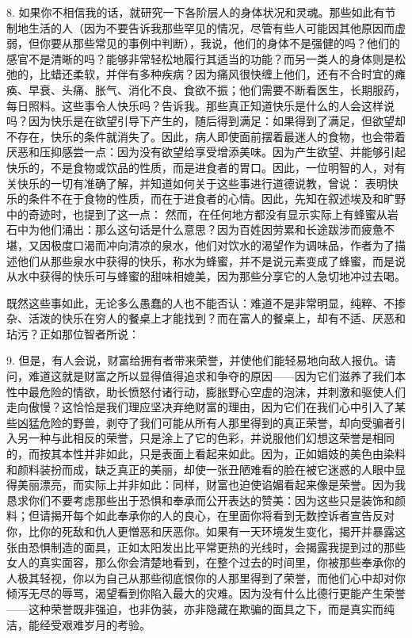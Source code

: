 8. 如果你不相信我的话，就研究一下各阶层人的身体状况和灵魂。那些如此有节制地生活的人（因为不要告诉我那些罕见的情况，尽管有些人可能因其他原因而虚弱，但你要从那些常见的事例中判断），我说，他们的身体不是强健的吗？他们的感官不是清晰的吗？能够非常轻松地履行其适当的功能？而另一类人的身体则是松弛的，比蜡还柔软，并伴有多种疾病？因为痛风很快缠上他们，还有不合时宜的瘫痪、早衰、头痛、胀气、消化不良、食欲不振；他们需要不断看医生，长期服药，每日照料。这些事令人快乐吗？告诉我。那些真正知道快乐是什么的人会这样说吗？因为快乐是在欲望引导下产生的，随后得到满足：如果得到了满足，但欲望却不存在，快乐的条件就消失了。因此，病人即使面前摆着最迷人的食物，也会带着厌恶和压抑感尝一点：因为没有欲望给享受增添美味。因为产生欲望、并能够引起快乐的，不是食物或饮品的性质，而是进食者的胃口。因此，一位明智的人，对有关快乐的一切有准确了解，并知道如何关于这些事进行道德说教，曾说： 表明快乐的条件不在于食物的性质，而在于进食者的心情。因此，先知在叙述埃及和旷野中的奇迹时，也提到了这一点： 然而，在任何地方都没有显示实际上有蜂蜜从岩石中为他们涌出：那么这句话是什么意思？因为百姓因劳累和长途跋涉而疲惫不堪，又因极度口渴而冲向清凉的泉水，他们对饮水的渴望作为调味品，作者为了描述他们从那些泉水中获得的快乐，称水为蜂蜜，并不是说元素变成了蜂蜜，而是说从水中获得的快乐可与蜂蜜的甜味相媲美，因为那些分享它的人急切地冲过去喝。\par

既然这些事如此，无论多么愚蠢的人也不能否认：难道不是非常明显，纯粹、不掺杂、活泼的快乐在穷人的餐桌上才能找到？而在富人的餐桌上，却有不适、厌恶和玷污？正如那位智者所说：\par

9. 但是，有人会说，财富给拥有者带来荣誉，并使他们能轻易地向敌人报仇。请问，难道这就是财富之所以显得值得追求和争夺的原因——因为它们滋养了我们本性中最危险的情欲，助长愤怒付诸行动，膨胀野心空虚的泡沫，并刺激和驱使人们走向傲慢？这恰恰是我们理应坚决弃绝财富的理由，因为它们在我们心中引入了某些凶猛危险的野兽，剥夺了我们可能从所有人那里得到的真正荣誉，却向受骗者引入另一种与此相反的荣誉，只是涂上了它的色彩，并说服他们幻想这荣誉是相同的，而按其本性并非如此，只是表面上看起来如此。因为，正如娼妓的美色由染料和颜料装扮而成，缺乏真正的美丽，却使一张丑陋难看的脸在被它迷惑的人眼中显得美丽漂亮，而实际上并非如此：同样，财富也迫使谄媚看起来像是荣誉。因为我恳求你们不要考虑那些出于恐惧和奉承而公开表达的赞美：因为这些只是装饰和颜料；但请揭开每个如此奉承你的人的良心，在里面你将看到无数控诉者宣告反对你，比你的死敌和仇人更憎恶和厌恶你。如果有一天环境发生变化，揭开并暴露这张由恐惧制造的面具，正如太阳发出比平常更热的光线时，会揭露我提到过的那些女人的真实面容，那么你会清楚地看到，在整个过去的时间里，你被那些奉承你的人极其轻视，你以为自己从那些彻底恨你的人那里得到了荣誉，而他们心中却对你倾泻无尽的辱骂，渴望看到你陷入最大的灾难。因为没有什么比德行更能产生荣誉——这种荣誉既非强迫，也非伪装，亦非隐藏在欺骗的面具之下，而是真实而纯洁，能经受艰难岁月的考验。\par


